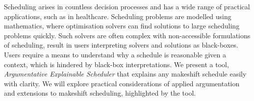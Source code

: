 Scheduling arises in countless decision processes and has a wide range of practical applications, such as in healthcare. Scheduling problems are modelled using mathematics, where optimisation solvers can find solutions to large scheduling problems quickly. Such solvers are often complex with non-accessible formulations of scheduling, result in users interpreting solvers and solutions as black-boxes. Users require a means to understand why a schedule is reasonable given a context, which is hindered by black-box interpretations.
\linespace
We present a tool, \emph{Argumentative Explainable Scheduler} that explains any makeshift schedule easily with clarity. We will explore practical considerations of applied argumentation and extensions to makeshift scheduling, highlighted by the tool.